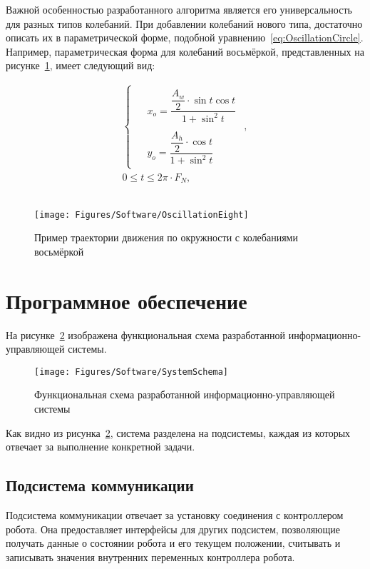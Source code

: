 Важной особенностью разработанного алгоритма является его универсальность для разных типов колебаний.
При добавлении колебаний нового типа, достаточно описать их в параметрической форме, подобной уравнению~\ref{eq:OscillationCircle}.
Например, параметрическая форма для колебаний восьмёркой, представленных на рисунке~\ref{fig:OscillationEight}, имеет следующий вид:

\begin{gather*}
    \begin{cases}
        \begin{aligned}
            &x_o = \dfrac{\dfrac{A_w}{2} \cdot \sin t \cos t}{1 + \sin^2 t} \\
            \\
            &y_o = \dfrac{\dfrac{A_h}{2} \cdot \cos t}{1 + \sin^2 t}
        \end{aligned}
    \end{cases}, \\
    0 \leq t \leq 2 \pi \cdot F_N,
\end{gather*} \\

\begin{figure}[H]
    \centering
    \vspace{14pt}
    \texttt{[image: Figures/Software/OscillationEight]}
    \caption{Пример траектории движения по окружности с колебаниями восьмёркой}
    \label{fig:OscillationEight}
\end{figure}


\section{Программное обеспечение}
На рисунке~\ref{fig:SystemSchema} изображена функциональная схема разработанной информационно-управляющей системы.

\begin{figure}[H]
    \centering
    \vspace{14pt}
    \texttt{[image: Figures/Software/SystemSchema]}
    \caption{Функциональная схема разработанной информационно-управляющей системы}
    \label{fig:SystemSchema}
\end{figure}

Как видно из рисунка~\ref{fig:SystemSchema}, система разделена на подсистемы, каждая из которых отвечает за выполнение конкретной задачи.

\subsection{Подсистема коммуникации}
Подсистема коммуникации отвечает за установку соединения с контроллером робота.
Она предоставляет интерфейсы для других подсистем, позволяющие получать данные о состоянии робота и его текущем положении, считывать и записывать значения внутренних переменных контроллера робота.

